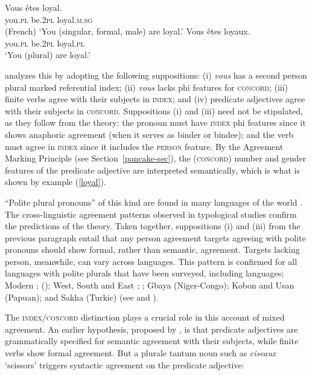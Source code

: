 \documentclass[output=paper
 	        ,biblatex
                ,babelshorthands
                ,newtxmath
                ,draftmode
                ,colorlinks, citecolor=brown
]{langscibook}
\begin{document}
\begin{exe} 
\ex\label{loyal}
\begin{xlist}
\ex
\gll   Vous		\^{e}tes		loyal. \\
		you.\textsc{pl}		be.\textsc{2pl}	loyal.\textsc{m.sg} \\\hfill(French)
\glt		`You (singular, formal, male) are loyal.’ 
\ex 
\gll	Vous		\^{e}tes		loyaux. \\
		you.\textsc{pl}		be.\textsc{2pl}	loyal.\textsc{pl} \\
\glt		`You (plural) are loyal.’  
\end{xlist}
\end{exe}

\noindent
\citet{Wechsler:2011} analyzes this by adopting the following suppositions: (i) \textit{vous} has a
second person plural marked referential index; (ii) \textit{vous} lacks phi features for
\textsc{concord}; (iii) finite verbs agree with their subjects in \textsc{index}; and (iv) predicate
adjectives agree with their subjects in \textsc{concord}.  Suppositions (i) and (iii) need not be
stipulated, as they follow from the theory:  the pronoun must have \textsc{index} phi features since
it shows anaphoric agreement (when it serves as binder or bindee); and the verb must agree in
\textsc{index} since it includes the \textsc{person} feature.  By the Agreement Marking
Principle (see Section~\ref{pancake-sec}), the (\textsc{concord}) number and gender features of the predicate adjective are interpreted semantically, which is what is shown by example (\ref{loyal}). 

``Polite plural pronouns'' of this kind are found in many languages of the world \citep{Head:1978}.   The cross-linguistic agreement patterns observed in typological studies \citep{Comrie:1975,Wechsler:2011} confirm the predictions of the theory.  Taken together, suppositions (i) and (iii) from the previous paragraph entail that any person agreement targets agreeing with polite pronouns should show formal, rather than semantic, agreement.  Targets lacking person, meanwhile, can vary across languages.  This pattern is confirmed for all languages with polite plurals that have been surveyed, including  languages; Modern ;  (); West, South and East ; ; Gbaya (Niger-Congo);  Kobon and Usan (Papuan); and Sakha (Turkic) (see \citealt{Comrie:1975} and \citealt{Wechsler:2011}).   
 
The \textsc{index/concord} distinction plays a crucial role in this account of mixed agreement.  An earlier hypothesis, proposed by \citet[230]{Kathol99b}, is that  predicate adjectives are grammatically specified for semantic  agreement with their subjects, while finite verbs show formal agreement.  But a plurale tantum noun such as \textit{ciseaux} `scissors’ triggers syntactic agreement on the predicate adjective:
	
\end{document}
